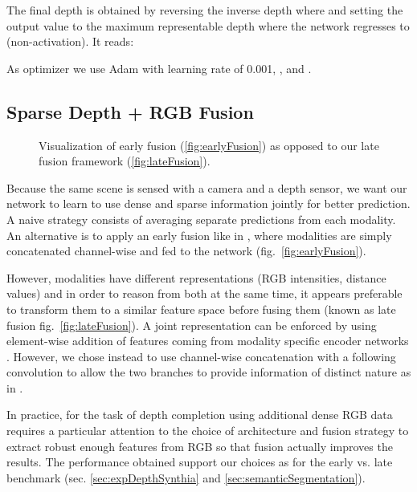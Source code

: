 \documentclass[10pt,twocolumn,letterpaper]{article}
\begin{document}
The final depth  is obtained by reversing the inverse depth  where  and setting the output value to the maximum representable depth  
where the network regresses to  (non-activation). It reads:

As optimizer we use Adam with learning rate of 0.001, ,  and .

\subsection{Sparse Depth + RGB Fusion}
\label{sec:fusion}
\begin{figure}
	\centering
	\caption{Visualization of early fusion (\ref{fig:earlyFusion}) as opposed to our late fusion framework (\ref{fig:lateFusion}).}
\end{figure}

Because the same scene is sensed with a camera and a depth sensor, we want our network to learn to use dense and sparse information jointly for better prediction. A naive strategy consists of averaging separate predictions from each modality. An alternative is to apply an early fusion like in \cite{ma2018sparse}, where modalities are simply concatenated channel-wise and fed to the network (fig.~\ref{fig:earlyFusion}).

However, modalities have different representations (RGB intensities, distance values) and in order to reason from both at the same time, it appears preferable to transform them to a similar feature space before fusing them (known as late fusion fig.~\ref{fig:lateFusion}). A joint representation can be enforced by using element-wise addition of features coming from modality specific encoder networks \cite{chen2017multi}. However, we chose instead to use channel-wise concatenation with a following convolution to allow the two branches to provide information of distinct nature as in \cite{valada2017adapnet}.

In practice, for the task of depth completion using additional dense RGB data requires a particular attention to the choice of architecture and fusion strategy to extract robust enough features from RGB so that fusion actually improves the results. The performance obtained support our choices as for the early vs. late benchmark (sec. \ref{sec:expDepthSynthia} and \ref{sec:semanticSegmentation}).
\end{document}

